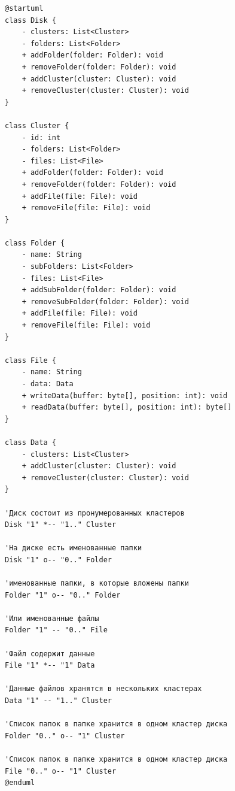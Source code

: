 \documentclass{article}
\begin{document}
\begin{verbatim}
@startuml
class Disk {
    - clusters: List<Cluster>
    - folders: List<Folder>
    + addFolder(folder: Folder): void
    + removeFolder(folder: Folder): void
    + addCluster(cluster: Cluster): void
    + removeCluster(cluster: Cluster): void
}

class Cluster {
    - id: int
    - folders: List<Folder>
    - files: List<File>
    + addFolder(folder: Folder): void
    + removeFolder(folder: Folder): void
    + addFile(file: File): void
    + removeFile(file: File): void
}

class Folder {
    - name: String
    - subFolders: List<Folder>
    - files: List<File>
    + addSubFolder(folder: Folder): void
    + removeSubFolder(folder: Folder): void
    + addFile(file: File): void
    + removeFile(file: File): void
}

class File {
    - name: String
    - data: Data
    + writeData(buffer: byte[], position: int): void
    + readData(buffer: byte[], position: int): byte[]
}

class Data {
    - clusters: List<Cluster>
    + addCluster(cluster: Cluster): void
    + removeCluster(cluster: Cluster): void
}

'Диск состоит из пронумерованных кластеров
Disk "1" *-- "1.." Cluster

'На диске есть именованные папки
Disk "1" o-- "0.." Folder

'именованные папки, в которые вложены папки
Folder "1" o-- "0.." Folder 

'Или именованные файлы
Folder "1" -- "0.." File

'Файл содержит данные
File "1" *-- "1" Data

'Данные файлов хранятся в нескольких кластерах
Data "1" -- "1.." Cluster

'Список папок в папке хранится в одном кластер диска
Folder "0.." o-- "1" Cluster

'Список папок в папке хранится в одном кластер диска
File "0.." o-- "1" Cluster
@enduml
\end{verbatim}
\end{document}
